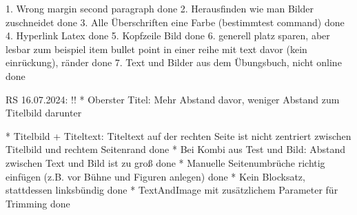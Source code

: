 1. Wrong margin second paragraph done
2. Herausfinden wie man Bilder zuschneidet done
3. Alle Überschriften eine Farbe (bestimmtest command) done
4. Hyperlink Latex done
5. Kopfzeile Bild done
6. generell platz sparen, aber lesbar zum beispiel item bullet point in einer reihe mit text davor (kein einrückung), ränder done
7. Text und Bilder aus dem Übungsbuch, nicht online done

RS 16.07.2024:
!! * Oberster Titel: Mehr Abstand davor, weniger Abstand zum Titelbild darunter

* Titelbild + Titeltext: Titeltext auf der rechten Seite ist nicht zentriert zwischen Titelbild und rechtem Seitenrand done
* Bei Kombi aus Test und Bild: Abstand zwischen Text und Bild ist zu groß done
* Manuelle Seitenumbrüche richtig einfügen (z.B. vor Bühne und Figuren anlegen) done
* Kein Blocksatz, stattdessen linksbündig done
* TextAndImage mit zusätzlichem Parameter für Trimming done